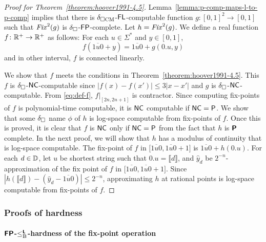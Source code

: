 \documentclass{article}
\theoremstyle{definition}
\theoremstyle{remark}
\begin{document}
\begin{proof}
[Proof for Theorem~\ref{theorem:hoover1991-4.5}]
 Lemma~\ref{lemma:p-comp-maps-l-to-p-comp} implies that
 there is $\delta _{\square \mathrm{CM}}$-$\mathsf{FL}$-computable function 
 $g \colon [0,1]^2 \to [0,1]$ such that $\mathit{Fix}^2(g)$ is
 $\delta _\square$-$\mathsf{FP}$-complete. Let $h = \mathit{Fix}^2(g)$.
 We define a real function $f \colon \mathbb R^+ \to \mathbb R^+$ as follows:
 For each $u \in \Sigma^*$ and $y \in [0, 1]$,
 \begin{equation}
  \label{eq:def-f}
 f(\overline{1u0} + y) = \overline{1u0} + g(0.u, y)
 \end{equation}
 and in other interval, $f$ is connected linearly.

 We show that $f$ meets the conditions in Theorem~\ref{theorem:hoover1991-4.5}.
 This $f$ is $\delta _\square$-$\mathsf{NC}$-computable since 
 $|f(x) - f(x')| \le 3|x-x'|$ and $g$ is $\delta _\square$-$\mathsf{NC}$-computable.
 From \eqref{eq:def-f},  $f|_{[2n, 2n+1]}$ is contractor.
 Since computing fix-points of $f$ is polynomial-time computable, 
 it is $\mathsf{NC}$ computable if $\mathsf{NC} = \mathsf{P}$.
 We show that some $\delta _\square$ name $\phi$ of $h$ is log-space computable 
 from fix-points of $f$.
 Once this is proved, it is clear that $f$ is $\mathsf{NC}$ only if 
 $\mathsf{NC} = \mathsf{P}$ from the fact that $h$ is $\text{\bfseries \sffamily \upshape P}$ complete.
 In the next proof, we will show that $h$ has a modulus of continuity that is
 log-space computable. 
 The fix-point of $f$ in $\bigl[ \overline{1u0}, \overline{1u0}+1 \bigr]$ is
 $\overline{1u0} + h(0.u)$.
 For each $d \in \mathbb D$, let $u$ be shortest string such that $0.u = \llbracket d \rrbracket$,
 and $\hat y_d$ be $2^{-n}$-approximation of the fix point of $f$ in
 $\bigl[ \overline{1u0}, \overline{1u0}+1 \bigr]$.
 Since  $\left|h(\llbracket d \rrbracket) - \left( \hat y_d - \overline{1u0} \right)\right| \le 2^{-n}$,
 approximating $h$ at rational points is log-space computable from fix-points of $f$.
\end{proof}




\subsubsection{Proofs of hardness}


\paragraph{\texorpdfstring{$\text{\bfseries \sffamily \upshape FP}$-$\leq _{\mathrm B} ^{\text{\bfseries \sffamily \upshape L}}$}{FP}-hardness of the fix-point operation}
\end{document}
